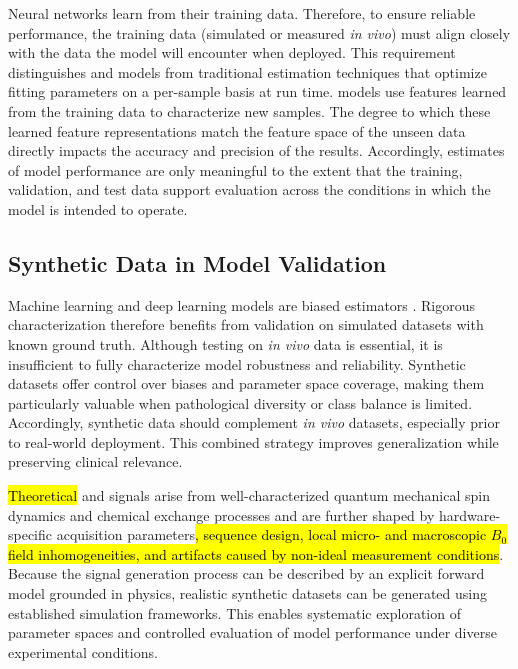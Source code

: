 Neural networks learn from their training data. Therefore, to ensure reliable performance, the training data (simulated or measured \textit{in vivo}) must align closely with the data the model will encounter when deployed. This requirement distinguishes \DL and \ML models from traditional estimation techniques that optimize fitting parameters on a per-sample basis at run time. \DL models use features learned from the training data to characterize new samples. The degree to which these learned feature representations match the feature space of the unseen data directly impacts the accuracy and precision of the results. Accordingly, estimates of model performance are only meaningful to the extent that the training, validation, and test data support evaluation across the conditions in which the model is intended to operate.

\subsection{Synthetic Data in Model Validation}
Machine learning and deep learning models are biased estimators \cite{Mehrabi2019, Rosenberg2024}. Rigorous characterization therefore benefits from validation on simulated datasets with known ground truth. Although testing on \textit{in vivo} data is essential, it is insufficient to fully characterize model robustness and reliability. Synthetic datasets offer control over biases and parameter space coverage, making them particularly valuable when pathological diversity or class balance is limited. Accordingly, synthetic data should complement \textit{in vivo} datasets, especially prior to real-world deployment. This combined strategy improves generalization while preserving clinical relevance.

\hl{Theoretical }\MRS and \MRSI signals arise from well-characterized quantum mechanical spin dynamics and chemical exchange processes and are further shaped by hardware-specific acquisition parameters\hl{, sequence design, local micro- and macroscopic $B_0$ field inhomogeneities, and artifacts caused by non-ideal measurement conditions}. Because the signal generation process can be described by an explicit forward model grounded in physics, realistic synthetic datasets can be generated using established simulation frameworks. This enables systematic exploration of parameter spaces and controlled evaluation of model performance under diverse experimental conditions.

